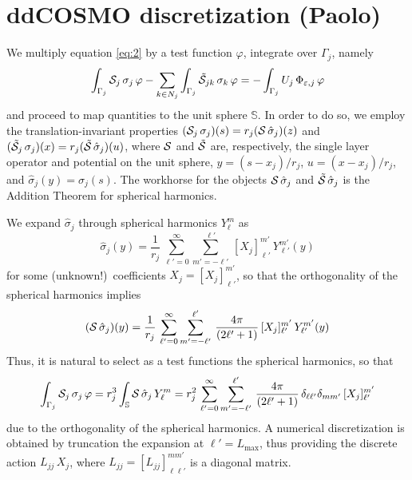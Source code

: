 \section{ddCOSMO discretization (Paolo)\label{app:mats}}
We multiply equation \eqref{eq:2} by a test function $\varphi$, integrate over $\Gamma_j$, namely
\begin{equation}\label{eq:50}
\int_{\Gamma_j} \mathcal{S}_j \, \sigma_j \, \varphi - \sum_{k \in N_j} \int_{\Gamma_j} \tilde{\mathcal{S}}_{jk} \, \sigma_k \, \varphi = -\int_{\Gamma_j} U_j \, \Phi_{\varepsilon,j} \, \varphi
\end{equation}
and proceed to map quantities to the unit sphere $\mathbb{S}$. In order to do so, we employ the translation-invariant properties $(\mathcal{S}_j \, \sigma_j)(s) = r_j( \mathcal{S} \, \hat{\sigma}_j)(z)$ and $(\tilde{\mathcal{S}}_j \, \sigma_j)(x) = r_j( \tilde{\mathcal{S}} \, \hat{\sigma}_j)(u)$, where $\mathcal{S}$ and $\tilde{\mathcal{S}}$ are, respectively, the single layer operator and potential on the unit sphere, $y = (s - x_j)/r_j$, $u = (x - x_j)/r_j$, and $\hat{\sigma}_j(y) = \sigma_j(s)$. The workhorse for the objects $\mathcal{S} \, \hat{\sigma}_j$ and $\tilde{\mathcal{S}} \, \hat{\sigma}_j$ is the Addition Theorem for spherical harmonics.

We expand $\hat{\sigma}_j$ through spherical harmonics $Y_\ell^m$ as
\[
\hat{\sigma}_j(y) = \frac{1}{r_j} \, \sum_{\ell'= 0}^{\infty} \sum_{m' = -\ell'}^{\ell'} \,  [X_j]_{\ell'}^{m'} \, Y_{\ell'}^{m'}(y)
\]
for some (unknown!)~coefficients $X_j = [X_j]_{\ell'}^{m'}$, so that the orthogonality of the spherical harmonics implies
\[
(\mathcal{S} \, \hat{\sigma}_j)(y) = \frac{1}{r_j} \, \sum_{\ell'= 0}^{\infty} \sum_{m' = -\ell'}^{\ell'} \, \frac{4\pi}{(2\ell' + 1)}\, [X_j]_{\ell'}^{m'} \, Y_{\ell'}^{m'}(y)
\]
Thus, it is natural to select as a test functions the spherical harmonics, so that
\begin{equation}\label{eq:51}
\int_{\Gamma_j} \mathcal{S}_j \, \sigma_j \, \varphi =  r_j^3 \int_\mathbb{S} \mathcal{S} \, \hat{\sigma}_j \, Y_\ell^m = r_j^2 \, \sum_{\ell'= 0}^{\infty} \sum_{m' = -\ell'}^{\ell'} \, \frac{4\pi}{(2\ell' + 1)} \, \delta_{\ell \ell'} \delta_{m m'}\, [X_j]_{\ell'}^{m'} 
\end{equation}
due to the orthogonality of the spherical harmonics. A numerical discretization is obtained by truncation the expansion at $\ell'=L_\text{max}$, thus providing the discrete action $L_{jj} \, X_j$, where $L_{jj} = [L_{jj}]_{\ell \ell'}^{m m'}$ is a diagonal matrix.

